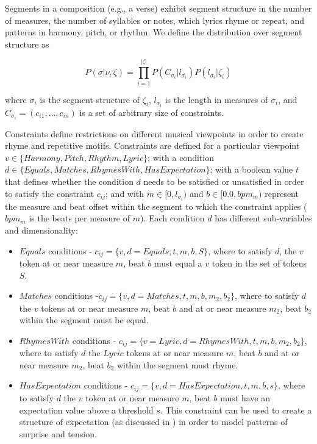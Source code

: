 \documentclass[letterpaper]{article}
\begin{document}
Segments in a composition (e.g., a verse) exhibit segment structure in the number of measures, the number of syllables or notes, which lyrics rhyme or repeat, and patterns in harmony, pitch, or rhythm. We define the distribution over segment structure as

\[ P(\sigma|\nu,\zeta) =  \prod_{i=1}^{|\zeta|} P(C_{\sigma_i} | l_{\sigma_i}) P(l_{\sigma_i}|\zeta_i) \]

\noindent where $\sigma_i$ is the segment structure of $\zeta_i$, $l_{\sigma_i}$ is the length in measures of $\sigma_i$, and $C_{\sigma_i} = ({c_{i1},\dots,c_{in}})$ is a set of arbitrary size of constraints. 

Constraints define restrictions on different musical viewpoints in order to create rhyme and repetitive motifs. Constraints are defined for a particular viewpoint $v\in\{Harmony, Pitch, Rhythm, Lyric\}$; with a condition $d\in\{Equals, Matches, RhymesWith, HasExpectation\}$; with a boolean value $t$ that defines whether the condition $d$ needs to be satisfied or unsatisfied in order to satisfy the constraint $c_{ij}$; and with $m\in[0,l_{\sigma_i})$ and $b\in[0.0,bpm_m)$ represent the measure and beat offset within the segment to which the constraint applies ($bpm_m$ is the beats per measure of $m$). Each condition $d$ has different sub-variables and dimensionality:

\begin{itemize}
\item $Equals$ conditions - $c_{ij} = \{v,d=Equals,t,m,b,S\}$, where to satisfy $d$, the $v$ token at or near measure $m$, beat $b$ must equal a $v$ token in the set of tokens $S$.
\item $Matches$ conditions -$c_{ij} = \{v,d=Matches,t,m,b,m_2,b_2\}$, where to satisfy $d$ the $v$ tokens at or near measure $m$, beat $b$ and at or near measure $m_2$, beat $b_2$ within the segment must be equal.
\item $RhymesWith$ conditions - $c_{ij} = \{v=Lyric,d=RhymesWith,t,m,b,m_2,b_2\}$, where to satisfy $d$ the $Lyric$ tokens at or near measure $m$, beat $b$ and at or near measure $m_2$, beat $b_2$ within the segment must rhyme.
\item $HasExpectation$ conditions - $c_{ij} = \{v,d=HasExpectation,t,m,b,s\}$, where to satisfy $d$ the $v$ token at or near measure $m$, beat $b$ must have an expectation value above a threshold $s$. This constraint can be used to create a structure of expectation (as discussed in \cite{meyer2008emotion}) in order to model patterns of surprise and tension.
\end{itemize}
\end{document}
